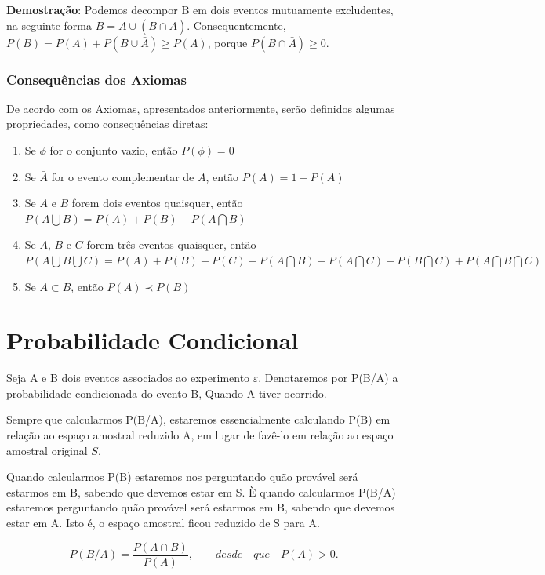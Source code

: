 \textbf{Demostração}: Podemos decompor B em dois eventos
mutuamente excludentes, na seguinte forma $B = A \cup (B \cap
\bar{A})$. Consequentemente, $P(B) = P(A)+ P(B \cup \bar{A}) \geq
P(A)$, porque $P(B \cap \bar{A}) \geq 0$.


\subsubsection{Consequências dos Axiomas}

\inic De acordo com os Axiomas, apresentados anteriormente, serão definidos algumas propriedades, como consequências diretas:

\begin{enumerate}
\item Se $\phi$ for o conjunto vazio, então $P(\phi)=0$
\item Se $\bar{A}$ for o evento complementar de $A$, então $P(A)=1-P(A)$
\item Se $A$ e $B$ forem dois eventos quaisquer, então $P(A \bigcup B)= P(A)+P(B)-P(A \bigcap B)$ 
\item Se $A$, $B$ e $C$ forem três eventos quaisquer, então $P(A \bigcup B \bigcup C)= P(A)+P(B)+P(C)- P(A \bigcap B)- P(A \bigcap C)- P(B \bigcap C)+P(A \bigcap B \bigcap C)$
\item Se $A \subset B$, então $P(A) \prec P(B)$
\end{enumerate}



\section{Probabilidade Condicional}

Seja A e B dois eventos associados ao experimento $\varepsilon$.
Denotaremos por P(B/A) a probabilidade condicionada do evento B,
Quando A tiver ocorrido.\vskip0.3cm

Sempre que calcularmos P(B/A), estaremos essencialmente calculando
P(B) em relação ao espaço amostral reduzido A, em lugar de fazê-lo
em relação ao espaço amostral original $S$.\vskip0.3cm

Quando calcularmos P(B) estaremos nos perguntando quão provável
será estarmos em B, sabendo que devemos estar em S. È quando
calcularmos P(B/A) estaremos perguntando quão provável será
estarmos em B, sabendo que devemos estar em A. Isto é, o espaço
amostral ficou reduzido de S para A.



\begin{equation}\label{}
    P(B/A) = \frac{P(A \cap B)}{P(A)}, \quad \quad desde \quad que
    \quad P(A)>0.
\end{equation}

